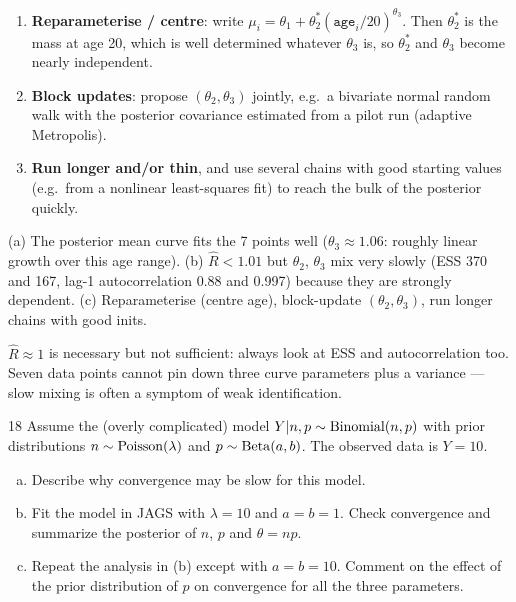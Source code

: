 \documentclass[11pt]{article}
\begin{document}
\begin{enumerate}[1.]
\item \textbf{Reparameterise / centre}: write $\mu_i=\theta_1+\theta_2^*(\texttt{age}_i/20)^{\theta_3}$. Then $\theta_2^*$ is the mass at age 20, which is well determined whatever $\theta_3$ is, so $\theta_2^*$ and $\theta_3$ become nearly independent.
\item \textbf{Block updates}: propose $(\theta_2,\theta_3)$ jointly, e.g.\ a bivariate normal random walk with the posterior covariance estimated from a pilot run (adaptive Metropolis).
\item \textbf{Run longer and/or thin}, and use several chains with good starting values (e.g.\ from a nonlinear least-squares fit) to reach the bulk of the posterior quickly.
\end{enumerate}

\begin{answer}
(a) The posterior mean curve fits the 7 points well ($\theta_3\approx1.06$: roughly linear growth over this age range). (b) $\hat R<1.01$ but $\theta_2$, $\theta_3$ mix very slowly (ESS 370 and 167, lag-1 autocorrelation 0.88 and 0.997) because they are strongly dependent. (c) Reparameterise (centre age), block-update $(\theta_2,\theta_3)$, run longer chains with good inits.
\end{answer}

\begin{takeaway}
$\hat R\approx1$ is necessary but not sufficient: always look at ESS and autocorrelation too. Seven data points cannot pin down three curve parameters plus a variance --- slow mixing is often a symptom of weak identification.
\end{takeaway}


\begin{problem}{18}
Assume the (overly complicated) model $Y|n,p\sim\mathrm{Binomial}(n,p)$ with prior distributions $n\sim\mathrm{Poisson}(\lambda)$ and $p\sim\mathrm{Beta}(a,b)$. The observed data is $Y=10$.
\begin{enumerate}[(a)]
\item Describe why convergence may be slow for this model.
\item Fit the model in JAGS with $\lambda=10$ and $a=b=1$. Check convergence and summarize the posterior of $n$, $p$ and $\theta=np$.
\item Repeat the analysis in (b) except with $a=b=10$. Comment on the effect of the prior distribution of $p$ on convergence for all the three parameters.
\end{enumerate}
\end{problem}
\end{document}
